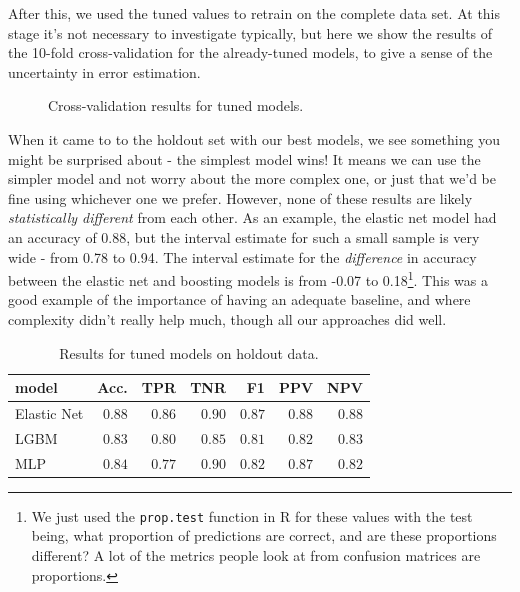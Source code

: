 \documentclass[
  letterpaper,
]{krantz}
\begin{document}
After this, we used the tuned values to retrain on the complete data
set. At this stage it's not necessary to investigate typically, but here
we show the results of the 10-fold cross-validation for the
already-tuned models, to give a sense of the uncertainty in error
estimation.

\begin{figure}[H]


\caption{\label{fig-benchmark}Cross-validation results for tuned
models.}

\end{figure}%

When it came to to the holdout set with our best models, we see
something you might be surprised about - the simplest model wins! It
means we can use the simpler model and not worry about the more complex
one, or just that we'd be fine using whichever one we prefer. However,
none of these results are likely \emph{statistically different} from
each other. As an example, the elastic net model had an accuracy of
0.88, but the interval estimate for such a small sample is very wide -
from 0.78 to 0.94. The interval estimate for the \emph{difference} in
accuracy between the elastic net and boosting models is from -0.07 to
0.18\footnote{We just used the \texttt{prop.test} function in R for
  these values with the test being, what proportion of predictions are
  correct, and are these proportions different? A lot of the metrics
  people look at from confusion matrices are proportions.}. This was a
good example of the importance of having an adequate baseline, and where
complexity didn't really help much, though all our approaches did well.

\begin{longtable}{lrrrrrr}

\caption{\label{tbl-benchmark-r}Results for tuned models on holdout
data.}

\tabularnewline

\toprule
model & Acc. & TPR & TNR & F1 & PPV & NPV \\ 
\midrule\addlinespace[2.5pt]
Elastic Net & \textcolor[HTML]{404040}{$0.88$} & \textcolor[HTML]{404040}{$0.86$} & \textcolor[HTML]{404040}{$0.90$} & \textcolor[HTML]{404040}{$0.87$} & \textcolor[HTML]{404040}{$0.88$} & \textcolor[HTML]{404040}{$0.88$} \\ 
LGBM & \textcolor[HTML]{404040}{$0.83$} & \textcolor[HTML]{404040}{$0.80$} & \textcolor[HTML]{404040}{$0.85$} & \textcolor[HTML]{404040}{$0.81$} & \textcolor[HTML]{404040}{$0.82$} & \textcolor[HTML]{404040}{$0.83$} \\ 
MLP & \textcolor[HTML]{404040}{$0.84$} & \textcolor[HTML]{404040}{$0.77$} & \textcolor[HTML]{404040}{$0.90$} & \textcolor[HTML]{404040}{$0.82$} & \textcolor[HTML]{404040}{$0.87$} & \textcolor[HTML]{404040}{$0.82$} \\ 
\bottomrule

\end{longtable}
\end{document}
